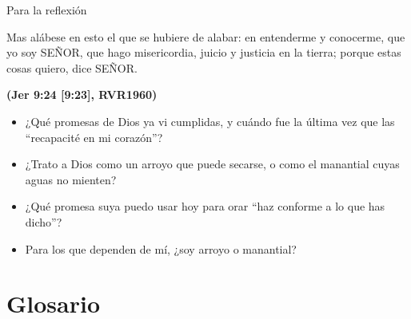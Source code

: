 \documentclass[hyperref={bookmarks=false},aspectratio=169]{beamer}
\newcommand{\SENOR}{S{\fontsize{0.78em}{1em}\selectfont EÑOR}}
\newcommand{\fuente}[1]{\par\hfill{\upshape\bfseries\footnotesize\textcolor{azul}{#1}}}
\begin{document}
\begin{frame}{Para la reflexión}
\begin{cita}Mas alábese en esto el que se hubiere de alabar: en entenderme y conocerme, que yo soy \SENOR{}, que hago misericordia, juicio y justicia en la tierra; porque estas cosas quiero, dice \SENOR{}.\fuente{(Jer 9:24 [9:23], RVR1960)}\end{cita}
\small
\begin{itemize}
\item ¿Qué promesas de Dios ya vi cumplidas, y cuándo fue la última vez que las ``recapacité en mi corazón''?
\item ¿Trato a Dios como un arroyo que puede secarse, o como el manantial cuyas aguas no mienten?
\item ¿Qué promesa suya puedo usar hoy para orar ``haz conforme a lo que has dicho''?
\item Para los que dependen de mí, ¿soy arroyo o manantial?
\end{itemize}
\end{frame}

\section{Glosario}
\end{document}
